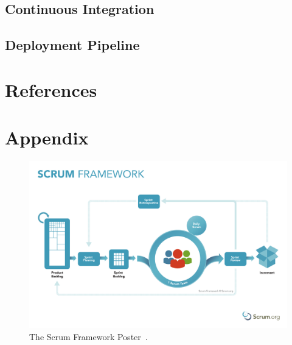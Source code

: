 \documentclass[12pt,a4paper]{article}
\theoremstyle{definition}
\begin{document}
    \subsection{Continuous Integration}

    \subsection{Deployment Pipeline}

\newpage

\section{References}

\begin{flushleft}
    
\end{flushleft}

\newpage

\section{Appendix}

    \begin{figure}[H]
        \centering
        \includegraphics[scale=0.4]{img/ScrumFramework.pdf}
        \caption{The Scrum Framework Poster~\cite{ScrumOrgPoster}.}
        \label{fig:ScrumOrgPoster}
    \end{figure}
\end{document}
